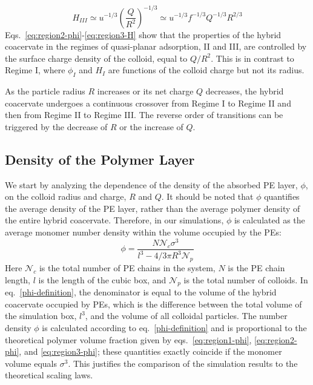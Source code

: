 \documentclass[journal=mamobx, manuscript=article]{achemso}
\begin{document}
\begin{equation}
\label{eq:region3-H}
H_{III}  \simeq u^{-1/3} \left( \frac{Q}{R^2} \right)^{-1/3} \simeq u^{-1/3}f^{-1/3}Q^{-1/3}R^{2/3}
\end{equation}
Eqs.~\ref{eq:region2-phi}-\ref{eq:region3-H} show that the properties of the hybrid coacervate in the regimes of quasi-planar adsorption, II and III, are controlled by the surface charge density of the colloid, equal to $Q/R^2$. This is in contrast to Regime I, where $\phi_{I}$ and $H_{I}$ are functions of the colloid charge but not its radius.

As the particle radius $R$ increases or its net charge $Q$ decreases, the hybrid coacervate undergoes a continuous crossover from Regime I to Regime II and then from Regime II to Regime III. The reverse order of transitions can be triggered by the decrease of $R$ or the increase of $Q$.~\cite{artem2022hybrid}



\subsection{Density of the Polymer Layer}
\label{subsection:phi}

We start by analyzing the dependence of the density of the absorbed PE layer, $\phi$, on the colloid radius and charge, $R$ and $Q$. It should be noted that $\phi$ quantifies the average density of the PE layer, rather than the average polymer density of the entire hybrid coacervate. Therefore, in our simulations, $\phi$ is calculated as the average monomer number density within the volume occupied by the PEs: 
\begin{equation}
\phi = \frac{N \mathcal{N}_{c} \sigma^{3} }{l^{3} - 4/3\pi R^{3} \mathcal{N}_{p} }  
\label{phi-definition}
\end{equation}
Here $ \mathcal{N}_{c}$ is the total number of PE chains in the system, $N$ is the PE chain length, $l$ is the length of the cubic box, and $\mathcal{N}_{p}$ is the total number of colloids. In eq.~\ref{phi-definition}, the denominator is equal to the volume of the hybrid coacervate occupied by PEs, which is the difference between the total volume of the simulation box, $l^3$, and the volume of all colloidal particles. The number density $\phi$ is calculated according to eq.~\ref{phi-definition} and is proportional to the theoretical polymer volume fraction given by eqs.~\ref{eq:region1-phi}, \ref{eq:region2-phi}, and \ref{eq:region3-phi}; these quantities exactly coincide if the monomer volume equals $\sigma^3$. This justifies the comparison of the simulation results to the theoretical scaling laws.  
\end{document}
